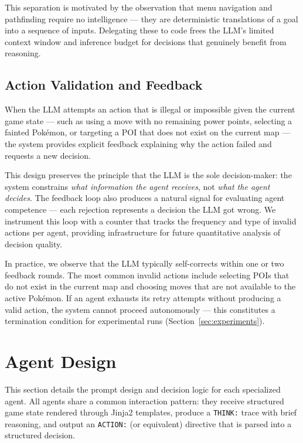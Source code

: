 \documentclass{article}
\begin{document}
This separation is motivated by the observation that menu navigation and pathfinding require no intelligence --- they are deterministic translations of a goal into a sequence of inputs. Delegating these to code frees the LLM's limited context window and inference budget for decisions that genuinely benefit from reasoning.

\subsection{Action Validation and Feedback}

When the LLM attempts an action that is illegal or impossible given the current game state --- such as using a move with no remaining power points, selecting a fainted Pok\'{e}mon, or targeting a POI that does not exist on the current map --- the system provides explicit feedback explaining why the action failed and requests a new decision.

This design preserves the principle that the LLM is the sole decision-maker: the system constrains \emph{what information the agent receives}, not \emph{what the agent decides}. The feedback loop also produces a natural signal for evaluating agent competence --- each rejection represents a decision the LLM got wrong. We instrument this loop with a counter that tracks the frequency and type of invalid actions per agent, providing infrastructure for future quantitative analysis of decision quality.

In practice, we observe that the LLM typically self-corrects within one or two feedback rounds. The most common invalid actions include selecting POIs that do not exist in the current map and choosing moves that are not available to the active Pok\'{e}mon. If an agent exhausts its retry attempts without producing a valid action, the system cannot proceed autonomously --- this constitutes a termination condition for experimental runs (Section~\ref{sec:experiments}).


\section{Agent Design}
\label{sec:agent-design}

This section details the prompt design and decision logic for each specialized agent. All agents share a common interaction pattern: they receive structured game state rendered through Jinja2 templates, produce a \texttt{THINK:} trace with brief reasoning, and output an \texttt{ACTION:} (or equivalent) directive that is parsed into a structured decision.
\end{document}
